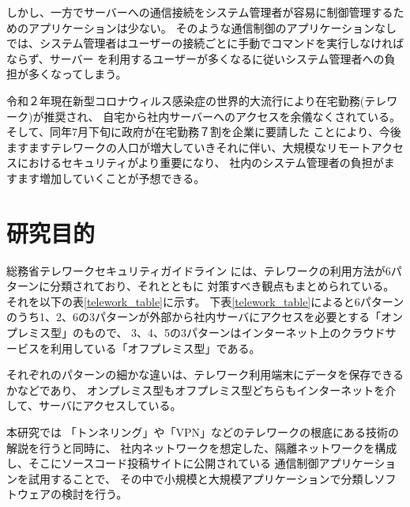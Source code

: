 \documentclass[11pt,a4j,titlepage]{jreport}
\begin{document}
しかし、一方でサーバーへの通信接続をシステム管理者が容易に制御管理するためのアプリケーションは少ない。
そのような通信制御のアプリケーションなしでは、システム管理者はユーザーの接続ごとに手動でコマンドを実行しなければならず、サーバー
を利用するユーザーが多くなるに従いシステム管理者への負担が多くなってしまう。\par
令和２年現在新型コロナウィルス感染症の世界的大流行により在宅勤務(テレワーク)が推奨され、
自宅から社内サーバーへのアクセスを余儀なくされている。そして、同年7月下旬に政府が在宅勤務７割を企業に要請した \cite{covid_nikkei}
ことにより、今後ますますテレワークの人口が増大していきそれに伴い、大規模なリモートアクセスにおけるセキュリティがより重要になり、
社内のシステム管理者の負担がますます増加していくことが予想できる。\par 





\section{研究目的}


総務省テレワークセキュリティガイドライン \cite{telework_guideline}には、テレワークの利用方法が6パターンに分類されており、それとともに
対策すべき観点もまとめられている。それを以下の表\ref{telework_table}に示す。
下表\ref{telework_table}によると6パターンのうち1、2、6の3パターンが外部から社内サーバにアクセスを必要とする「オンプレミス型」のもので、
3、4、5の3パターンはインターネット上のクラウドサービスを利用している「オフプレミス型」である。

それぞれのパターンの細かな違いは、テレワーク利用端末にデータを保存できるかなどであり、
オンプレミス型もオフプレミス型どちらもインターネットを介して、サーバにアクセスしている。
\par 本研究では
「トンネリング」や「VPN」などのテレワークの根底にある技術の解説を行うと同時に、
社内ネットワークを想定した、隔離ネットワークを構成し、そこにソースコード投稿サイトに公開されている
通信制御アプリケーションを試用することで、
その中で小規模と大規模アプリケーションで分類しソフトウェアの検討を行う。
\end{document}
